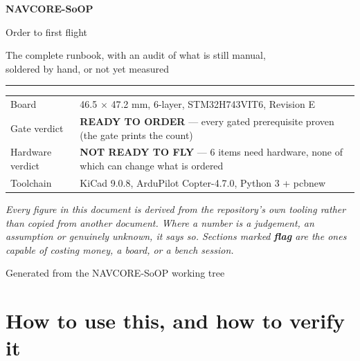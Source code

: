 \documentclass[11pt,a4paper]{article}
\newcommand{\flag}[1]{\textcolor{warnred}{\textbf{#1}}}
\newcommand{\good}[1]{\textcolor{okgreen}{\textbf{#1}}}
\begin{document}
\begin{titlepage}
\centering
\vspace*{25mm}
{\Huge\bfseries\color{navy} NAVCORE-SoOP\par}
\vspace{4mm}
{\Large Order to first flight\par}
\vspace{2mm}
{\large The complete runbook, with an audit of what is still manual,\\ soldered by hand, or not yet measured\par}
\vspace{12mm}
\rule{0.72\textwidth}{0.4pt}
\vspace{6mm}

\begin{tabular}{@{}ll@{}}
\toprule
Board & 46.5 $\times$ 47.2 mm, 6-layer, STM32H743VIT6, Revision E \\
Gate verdict & \good{READY TO ORDER} --- every gated prerequisite proven (the gate prints the count) \\
Hardware verdict & \flag{NOT READY TO FLY} --- 6 items need hardware, none of which can change what is ordered \\
Toolchain & KiCad 9.0.8, ArduPilot Copter-4.7.0, Python 3 + pcbnew \\
\bottomrule
\end{tabular}

\vspace{8mm}
\begin{minipage}{0.82\textwidth}
\small\itshape
Every figure in this document is derived from the repository's own tooling rather than
copied from another document. Where a number is a
judgement, an assumption or genuinely unknown, it says so. Sections marked
\flag{flag} are the ones capable of costing money, a board, or a bench session.
\end{minipage}

\vfill
{\small Generated from the NAVCORE-SoOP working tree\par}
\end{titlepage}

\tableofcontents
\newpage

\section*{How to use this, and how to verify it}
\end{document}
